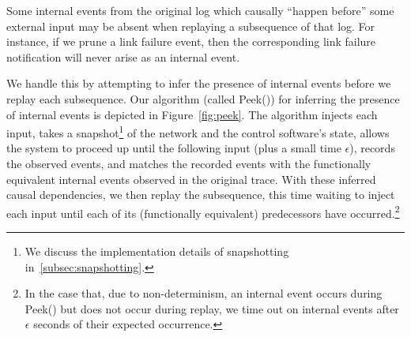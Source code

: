  Some internal events from the original
log which causally ``happen before'' some external input
may be absent when replaying a subsequence of that log.
For instance, if we prune a link failure event, then
the corresponding link failure notification will never arise as an internal event.

We handle this by attempting to infer the presence of internal
events before we replay each subsequence. Our algorithm (called {\sc Peek()}) for inferring the
presence of internal events is depicted in
Figure~\ref{fig:peek}. The algorithm injects each input, takes a
snapshot\footnote{We discuss the implementation details of snapshotting
in~\ref{subsec:snapshotting}.} of
the network and the control software's state, allows the system to proceed up
until the following input (plus a small time $\epsilon$), records the observed
events, and matches the
recorded events with the functionally equivalent internal events observed in
the original trace. With these inferred causal dependencies, we then replay
the subsequence, this time waiting to inject each input until each of its
(functionally equivalent) predecessors have occurred.\footnote{In the
case that, due
to non-determinism, an internal event occurs during {\sc Peek()} but does not occur
during replay, we time out on internal events after $\epsilon$ seconds of
their expected occurrence.}


